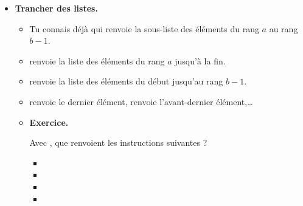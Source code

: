 \documentclass[11pt,class=report,crop=false]{standalone}
\begin{document}
\newcommand{\badletter}[1]{\underline{\textcolor{red}{#1}}}







\begin{cours}
\sauteligne
\begin{itemize}
  \item \textbf{Trancher des listes.}
  

  \begin{itemize}
    \item Tu connais déjà  qui renvoie la sous-liste des éléments du rang $a$ au rang $b-1$.
    
    \item {} renvoie la liste des éléments du rang $a$ jusqu'à la fin.
      
    \item {} renvoie la liste des éléments du début jusqu'au rang $b-1$.
    
    \item {} renvoie le dernier élément,  renvoie l'avant-dernier élément,\ldots

  \item \textbf{Exercice.} 
  
  Avec , 
que renvoient les instructions suivantes ?


  
\begin{itemize}
  \item {}
  \item {}
  \item {}
  \item {}
\end{itemize}


\end{itemize}
\end{itemize}
\end{cours}
\end{document}
